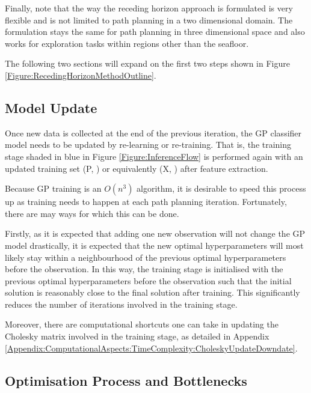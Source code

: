 			Finally, note that the way the receding horizon approach is formulated is very flexible and is not limited to path planning in a two dimensional domain. The formulation stays the same for path planning in three dimensional space and also works for exploration tasks within regions other than the seafloor.
			
			The following two sections will expand on the first two steps shown in Figure \ref{Figure:RecedingHorizonMethodOutline}.
	
		\subsection{Model Update}
		\label{InformativeSeafloorExploration:RecedingHorizonFormulation:ModelUpdate}
				
			Once new data is collected at the end of the previous iteration, the GP classifier model needs to be updated by re-learning or re-training. That is, the training stage shaded in blue in Figure \ref{Figure:InferenceFlow} is performed again with an updated training set (P, ) or equivalently (X, ) after feature extraction.
			
			Because GP training is an $O(n^{3})$ algorithm, it is desirable to speed this process up as training needs to happen at each path planning iteration. Fortunately, there are may ways for which this can be done.
			
			Firstly, as it is expected that adding one new observation will not change the GP model drastically, it is expected that the new optimal hyperparameters will most likely stay within a neighbourhood of the previous optimal hyperparameters before the observation. In this way, the training stage is initialised with the previous optimal hyperparameters before the observation such that the initial solution is reasonably close to the final solution after training. This significantly reduces the number of iterations involved in the training stage.
			
			Moreover, there are computational shortcuts one can take in updating the Cholesky matrix involved in the training stage, as detailed in Appendix \ref{Appendix:ComputationalAspects:TimeComplexity:CholeskyUpdateDowndate}.
			
		\subsection{Optimisation Process and Bottlenecks}
		\label{InformativeSeafloorExploration:RecedingHorizonFormulation:OptimisationProcess}
	

